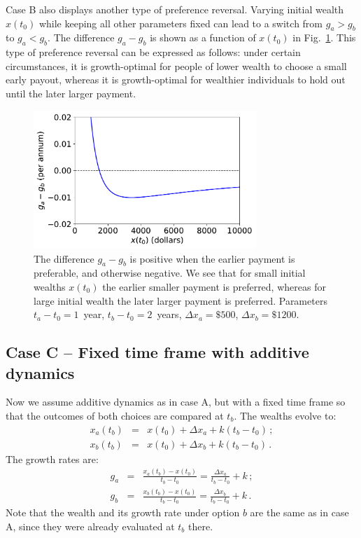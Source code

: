 \documentclass[11pt]{article}
\newcommand{\flabel}[1]{\label{fig:#1}}
\newcommand{\fref}[1]{Fig.~\ref{fig:#1}}
\newcommand{\bea}{\begin{eqnarray}}
\newcommand{\eea}{\end{eqnarray}}
\newcommand{\Dx}{\Delta x}
\numberwithin{equation}{section}
\begin{document}
Case B also displays another type of preference reversal. Varying initial wealth $x(t_0)$ while keeping all other parameters fixed can lead to a switch from $g_a>g_b$ to $g_a<g_b$. 
The difference $g_a-g_b$ is shown as a function of $x(t_0)$ in \fref{reversal_2}. This type of preference reversal can be expressed as follows: under certain circumstances, it is growth-optimal for people of lower wealth to choose a small early payout, whereas it is growth-optimal for wealthier individuals to hold out until the later larger payment.

\begin{figure}[!htb]
\centering
\includegraphics[width=0.75\textwidth]{./figures/ga_gb.pdf}
\caption{The difference $g_a-g_b$ is positive when the earlier payment is preferable, and otherwise negative. We see that for small initial wealths $x(t_0)$ the earlier smaller payment is preferred, whereas for large initial wealth the later larger payment is preferred. Parameters $t_a-t_0=1$~year, $t_b-t_0=2$~years, $\Delta x_a=\$500$, $\Delta x_b=\$1200$.}
\flabel{reversal_2}
\end{figure}

\FloatBarrier
\subsection{Case C -- Fixed time frame with additive dynamics}\label{sec:case_C}

Now we assume additive dynamics as in case A, but with a fixed time frame so that the outcomes of both choices are compared at $t_b$. The wealths evolve to: \bea
x_a\left(t_b\right) &=& x\left(t_0\right) + \Dx_a + k(t_b-t_0)\,; \\
x_b\left(t_b\right) &=& x\left(t_0\right) + \Dx_b + k(t_b-t_0)\,.
\eea
The growth rates are:
\bea
g_a &=& \frac{x_a\left(t_b\right) - x\left(t_0\right)}{t_b-t_0} = \frac{\Dx_a}{t_b-t_0} + k\,;\\
g_b &=& \frac{x_b\left(t_b\right) - x\left(t_0\right)}{t_b-t_0} = \frac{\Dx_b}{t_b-t_0} + k\,.
\eea
Note that the wealth and its growth rate under option $b$ are the same as in case A, since they were already evaluated at $t_b$ there.
\end{document}
